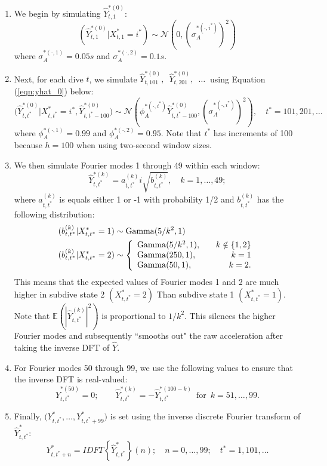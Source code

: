 \begin{enumerate}
    \item We begin by simulating $\hat{Y}^{*(0)}_{t,1}$:
    $$
    	(\hat{Y}^{*(0)}_{t,1}|X^*_{t,1} = i^*) \sim \mathcal{N} \left(0, \left(\sigma_A^{*(\cdot,i^*)}\right)^2 \right)
    $$
    where $\sigma_A^{*(\cdot,1)} = 0.05s$ and $\sigma_A^{*(\cdot,2)} = 0.1s$. 
    \item Next, for each dive $t$, we simulate $\hat{Y}^{*(0)}_{t,101},\enspace \hat{Y}^{*(0)}_{t,201}, \enspace \ldots ~ $ using Equation (\ref{eqn:yhat_0}) below:
    \begin{equation}	
        \Big(\hat{Y}^{*(0)}_{t,t^*}|X^*_{t,t^*} = i^*,\hat{Y}^{*(0)}_{t,t^*-100}\Big) \sim \mathcal{N} \left(\phi_A^{*(\cdot,i^*)} \hat{Y}^{*(0)}_{t,t^*-100}, \left(\sigma_A^{*(\cdot,i^*)}\right)^2 \right), \quad t^* = 101,201,\ldots
    	\label{eqn:yhat_0}
    \end{equation}
    where $\phi_A^{*(\cdot,1)} = 0.99$ and $\phi_A^{*(\cdot,2)} = 0.95$. Note that $t^*$ has increments of 100 because $h=100$ when using two-second window sizes.
    \item We then simulate Fourier modes 1 through 49 within each window:
    $$
    	\hat{Y}^{*(k)}_{t,t^*} = a_{t,t^*}^{(k)} i\sqrt{b^{(k)}_{t,t^*}}, \quad k = 1,\ldots,49;
    $$
    where $a^{(k)}_{t,t^*}$ is equals either 1 or -1 with probability 1/2 and $b^{(k)}_{t,t^*}$ has the following distribution:
    \begin{align}
    \begin{split}
    	(b^{(k)}_{t,t^*}|X^*_{t,t^*} = 1) &\sim {\rm{Gamma}}(5/k^2, 1) \\
    	(b^{(k)}_{t,t^*}|X^*_{t,t^*} = 2) &\sim \left\{\begin{array}{lr}
    	{\rm{Gamma}}(5/k^2, 1), \quad & k \notin \{1,2\} \\
    	{\rm{Gamma}}(250,1), & k = 1 \\
    	{\rm{Gamma}}(50,1), & k = 2.
    	\end{array}\right. 
    \end{split}
    \end{align}
    This means that the expected values of Fourier modes 1 and 2 are much higher in subdive state 2 $(X^*_{t,t^*} = 2)$ Than subdive state 1 $(X^*_{t,t^*} = 1)$. Note that $\mathbb{E}\left(|\hat{Y}^{(k)}_{t,t^*}|^2\right)$ is proportional to $1/k^2$. This silences the higher Fourier modes and subsequently ``smooths out" the raw acceleration after taking the inverse DFT of $\hat Y$. 
    \item For Fourier modes 50 through 99, we use the following values to ensure that the inverse DFT is real-valued:
    $$
    \hat{Y}^{*(50)}_{t,t^*} = 0; \qquad
	\hat{Y}^{*(k)}_{t,t^*} = -\hat{Y}^{*(100-k)}_{t,t^*} \enspace \text{for} \enspace k = 51,\ldots,99.
    $$
    \item Finally, $\Big(Y^*_{t,t^*},\ldots,Y^*_{t,t^*+99}\Big)$ is set using the inverse discrete Fourier transform of $\hat{Y}^*_{t,t^*}$:
    $$Y^*_{t,t^*+n} = IDFT\left\{\hat{Y}^*_{t,t^*}\right\}(n); \quad n = 0,\ldots,99; \quad t^* = 1,101,\ldots$$
\end{enumerate}
